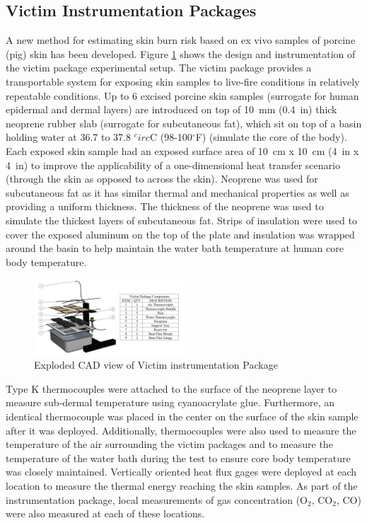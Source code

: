 \documentclass[12pt,oneside]{book}
\begin{document}
\subsection{Victim Instrumentation Packages}
A new method for estimating skin burn risk based on ex vivo samples of porcine (pig) skin has been developed. Figure \ref{fig:inst_SBA} shows the design and instrumentation of the victim package experimental setup. The victim package provides a transportable system for exposing skin samples to live-fire conditions in relatively repeatable conditions.  Up to 6 excised porcine skin samples (surrogate for human epidermal and dermal layers) are introduced on top of 10~mm (0.4~in) thick neoprene rubber slab (surrogate for subcutaneous fat), which sit on top of a basin holding water at 36.7 to 37.8 $^circ$C (98-100$^\circ$F) (simulate the core of the body).  Each exposed skin sample had an exposed surface area of 10~cm x 10~cm (4~in x 4~in) to improve the applicability of a one-dimensional heat transfer scenario (through the skin as opposed to across the skin).  Neoprene was used for subcutaneous fat as it has similar thermal and mechanical properties as well as providing a uniform thickness. The thickness of the neoprene was used to simulate the thickest layers of subcutaneous fat. Strips of insulation were used to cover the exposed aluminum on the top of the plate and insulation was wrapped around the basin to help maintain the water bath temperature at human core body temperature. 


\begin{figure}[H]
\centering
\includegraphics[width=0.5\textwidth]{../0_Images/Instrumentation/Burn_Measurements/Skin_Burn_Assessment_Package}
\caption{Exploded CAD view of Victim instrumentation Package}
\label{fig:inst_SBA}
\end{figure}

Type K thermocouples were attached to the surface of the neoprene layer to measure sub-dermal temperature using cyanoacrylate glue.  Furthermore, an identical thermocouple was placed in the center on the surface of the skin sample after it was deployed.  Additionally, thermocouples were also used to measure the temperature of the air surrounding the victim packages and to measure the temperature of the water bath during the test to ensure core body temperature was closely maintained.  Vertically oriented heat flux gages were deployed at each location to measure the thermal energy reaching the skin samples.  As part of the instrumentation package, local measurements of gas concentration (O$_2$, CO$_2$, CO) were also measured at each of these locations.
\end{document}
